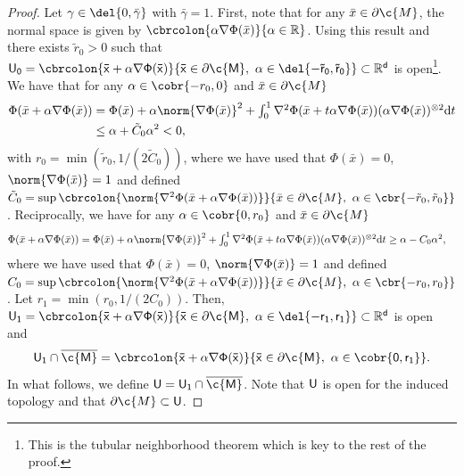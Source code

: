 \begin{proof}
	Let $\gamma \in \del{0, \bar{\gamma}}$ with $\bar{\gamma} = 1$.
	First, note that for any $\bar{x} \in \partial \c{M}$, the normal space is given by $\cbrcolon{\alpha \nabla \Phi(\bar{x})}{\alpha \in \R}$.
	Using this result and \cite[Theorem 6.24]{lee2013smooth} there exists $\tilde{r}_0 > 0$ such that $\sf{U}_0 = \cbrcolon{\bar{x} + \alpha \nabla \Phi(\bar{x})}{\bar{x} \in \partial \c{M}, \ \alpha \in \del{-\tilde{r}_0, \tilde{r}_0}} \subset \R^d$ is open\footnote{This is the tubular neighborhood theorem which is key to the rest of the proof.
	}.
	We have that for any $\alpha \in \cobr{-r_0, 0}$ and $\bar{x} \in \partial \c{M}$ \begin{align} \Phi(\bar{x}+\alpha \nabla \Phi(\bar{x})) &= \textstyle{\Phi(\bar{x}) + \alpha \norm{\nabla \Phi(\bar{x})}^2 + \int_0^1 \nabla^2 \Phi(\bar{x}+t\alpha \nabla \Phi(\bar{x}))(\alpha \nabla \Phi(\bar{x}))^{\otimes 2} \mathrm{d} t } \\ &\leq \alpha + \tilde{C}_0 \alpha^2 < 0, \end{align} with $r_0 = \min(\tilde{r}_0, 1/(2\tilde{C}_0 ))$, where we have used that $\Phi(\bar{x}) = 0$, $\norm{\nabla \Phi(\bar{x})}=1$ and defined $\tilde{C}_0 = \sup \cbrcolon{\norm{\nabla^2 \Phi(\bar{x}+\alpha \nabla \Phi(\bar{x}))}}{\bar{x} \in \partial \c{M}, \ \alpha \in \cbr{-\tilde{r}_0,\tilde{r}_0}}$.
	Reciprocally, we have for any $\alpha \in \cobr{0,r_0}$ and $\bar{x} \in \partial \c{M}$ \begin{align} \Phi(\bar{x}+\alpha \nabla \Phi(\bar{x})) &= \textstyle{\Phi(\bar{x}) + \alpha \norm{\nabla \Phi(\bar{x})}^2 + \int_0^1 \nabla^2 \Phi(\bar{x}+t\alpha \nabla \Phi(\bar{x}))(\alpha \nabla \Phi(\bar{x}))^{\otimes 2} \mathrm{d} t } \geq \alpha - C_0 \alpha^2, \end{align} where we have used that $\Phi(\bar{x}) =0$, $\norm{\nabla \Phi(\bar{x})}=1$ and defined $C_0 = \sup \cbrcolon{\norm{\nabla^2 \Phi(\bar{x}+\alpha \nabla \Phi(\bar{x}))}}{\bar{x} \in \partial \c{M}, \ \alpha \in \cbr{-r_0,r_0}}$.
	Let $r_1 = \min(r_0, 1/(2C_0))$.
	Then, $\sf{U}_1 = \cbrcolon{\bar{x} + \alpha \nabla \Phi(\bar{x})}{\bar{x} \in \partial \c{M}, \ \alpha \in \del{-r_1, r_1}} \subset \R^d$ is open and \begin{equation} \sf{U}_1 \cap \cl{\c{M}} = \cbrcolon{\bar{x} + \alpha \nabla \Phi(\bar{x})}{\bar{x} \in \partial \c{M}, \ \alpha \in \cobr{0, r_1}} .
	\end{equation}
	In what follows, we define $\sf{U} = \sf{U}_1 \cap \cl{\c{M}}$.
	Note that $\sf{U}$ is open for the induced topology and that $\partial \c{M} \subset \sf{U}$.

\end{proof}
